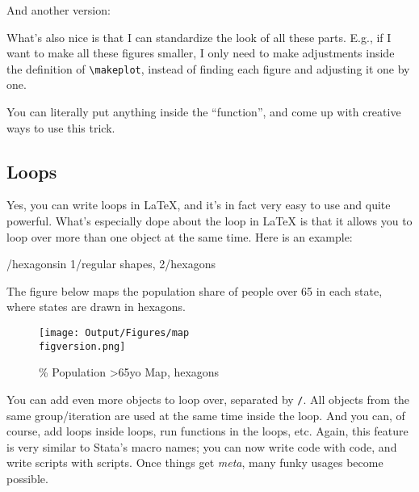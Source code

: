 \renewcommand{\figversion}{1} %
\renewcommand{\figname}{regular shapes}
\makeplot %

And another version:

\renewcommand{\figversion}{2} %
\renewcommand{\figname}{hexagons}
\makeplot %

What's also nice is that I can standardize the look of all these parts. E.g., if I want to make all these figures smaller, I only need to make adjustments inside the definition of \verb|\makeplot|, instead of finding each figure and adjusting it one by one. 

You can literally put anything inside the ``function'', and come up with creative ways to use this trick. 

\subsection{Loops}
Yes, you can write loops in {\LaTeX}, and it's in fact very easy to use and quite powerful. What's especially dope about the loop in {\LaTeX} is that it allows you to loop over more than one object at the same time. Here is an example:

\foreach \figversion/\figname in {1/regular shapes, 2/hexagons}{
    The figure below maps the population share of people over 65 in each state, where states are drawn in \figname.
    \begin{figure}[H]
        \caption{\% Population >65yo Map, \figname}
        \begin{center}
            \texttt{[image: Output/Figures/map\\figversion.png]}
        \end{center}
    \end{figure}
}

You can add even more objects to loop over, separated by \verb|/|. All objects from the same group/iteration are used at the same time inside the loop. And you can, of course, add loops inside loops, run functions in the loops, etc. Again, this feature is very similar to Stata's macro names; you can now write code with code, and write scripts with scripts. Once things get \textit{meta}, many funky usages become possible. 





